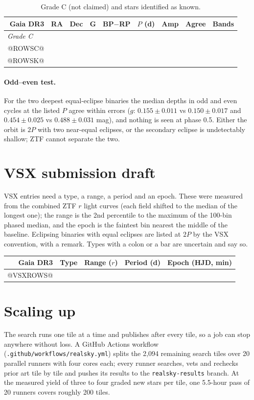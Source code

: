 \documentclass[11pt]{article}
\begin{document}
{\small\setlength{\tabcolsep}{3.5pt}
\begin{longtable}{rrrrrrrcc}
\caption{Grade C (not claimed) and stars identified as known.}\\
\toprule Gaia DR3 & RA & Dec & G & BP$-$RP & $P$ (d) & Amp & Agree & Bands\\\midrule
\multicolumn{9}{l}{\emph{Grade C}}\\
@ROWSC@
\multicolumn{9}{l}{\emph{Known}}\\
@ROWSK@
\bottomrule\end{longtable}}

\paragraph{Odd--even test.} For the two deepest equal-eclipse binaries the median depths in odd and even cycles at the listed $P$ agree within errors ($g$: $0.155\pm0.011$ vs $0.150\pm0.017$ and $0.454\pm0.025$ vs $0.488\pm0.031$ mag), and nothing is seen at phase 0.5. Either the orbit is $2P$ with two near-equal eclipses, or the secondary eclipse is undetectably shallow; ZTF cannot separate the two.

\section{VSX submission draft}
VSX entries need a type, a range, a period and an epoch. These were measured from the combined ZTF $r$ light curves (each field shifted to the median of the longest one); the range is the 2nd percentile to the maximum of the 100-bin phased median, and the epoch is the faintest bin nearest the middle of the baseline. Eclipsing binaries with equal eclipses are listed at $2P$ by the VSX convention, with a remark. Types with a colon or a bar are uncertain and say so.

{\small\setlength{\tabcolsep}{4pt}
\begin{longtable}{rlccc}
\toprule Gaia DR3 & Type & Range ($r$) & Period (d) & Epoch (HJD, min)\\\midrule\endhead
@VSXROWS@
\bottomrule\end{longtable}}

\section{Scaling up}
The search runs one tile at a time and publishes after every tile, so a job can stop anywhere without loss. A GitHub Actions workflow (\texttt{.github/workflows/realsky.yml}) splits the 2{,}094 remaining search tiles over 20 parallel runners with four cores each; every runner searches, vets and rechecks prior art tile by tile and pushes its results to the \texttt{realsky-results} branch. At the measured yield of three to four graded new stars per tile, one 5.5-hour pass of 20 runners covers roughly 200 tiles.
\end{document}
